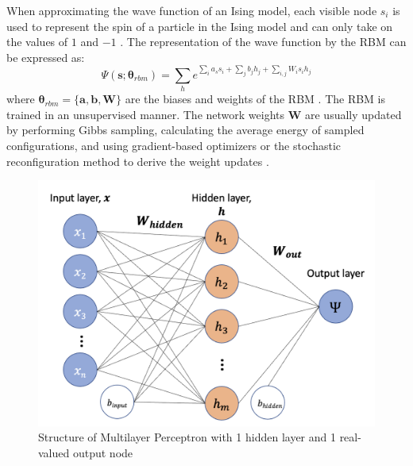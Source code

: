 When approximating the wave function of an Ising model, each visible node $s_i$ is used to represent the spin of a particle in the Ising model and can only take on the values of $1$ and $-1$ \cite{b20}. The representation of the wave function by the RBM can be expressed as:
\begin{equation}
    \Psi(\boldsymbol{s} ; \boldsymbol{\theta}_{rbm}) = \sum_{h} e^{\sum_i a_s s_i + \sum_j b_j h_j + \sum_{i,j}W_i s_i h_j} 
\end{equation}
where  $\boldsymbol{\theta}_{rbm} = \{\boldsymbol{a}, \boldsymbol{b}, \boldsymbol{W}\}$ are the biases and weights of the RBM \cite{b20}. The RBM is trained in an unsupervised manner. The network weights $\mathbf{W}$ are usually updated by performing Gibbs sampling, calculating the average energy of sampled configurations, and using gradient-based optimizers or the stochastic reconfiguration method to derive the weight updates \cite{b25}.

\begin{figure}[h!]
    \centering
    \includegraphics[width=0.7\linewidth]{images/mlp_diagram.png}
    \caption{Structure of Multilayer Perceptron with 1 hidden layer and 1 real-valued output node}
    \label{rbmstructure}
\end{figure}


